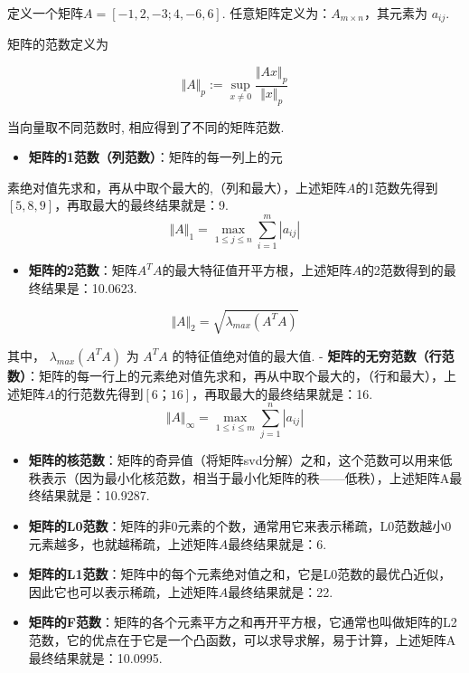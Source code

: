 定义一个矩阵\(A=[-1, 2, -3; 4, -6, 6]\).
任意矩阵定义为：\(A_{m\times n}\)，其元素为 \(a_{ij}\).

矩阵的范数定义为

\[
\Vert{A}\Vert_p :=\sup_{x\neq 0}\frac{\Vert{Ax}\Vert_p}{\Vert{x}\Vert_p}
\]

当向量取不同范数时, 相应得到了不同的矩阵范数.

\begin{itemize}
 
\item
  \textbf{矩阵的1范数（列范数）}：矩阵的每一列上的元
\end{itemize}

素绝对值先求和，再从中取个最大的,（列和最大），上述矩阵\(A\)的1范数先得到\([5,8,9]\)，再取最大的最终结果就是：9.
\[
\Vert A\Vert_1=\max_{1\le j\le n}\sum_{i=1}^m|{a_{ij}}|
\]

\begin{itemize}
 
\item
  \textbf{矩阵的2范数}：矩阵\(A^TA\)的最大特征值开平方根，上述矩阵\(A\)的2范数得到的最终结果是：10.0623.
\end{itemize}

\[
\Vert A\Vert_2=\sqrt{\lambda_{max}(A^T A)}
\]

其中， \(\lambda_{max}(A^T A)\) 为 \(A^T A​\) 的特征值绝对值的最大值. -
\textbf{矩阵的无穷范数（行范数）}：矩阵的每一行上的元素绝对值先求和，再从中取个最大的，（行和最大），上述矩阵\(A\)的行范数先得到\([6；16]\)，再取最大的最终结果就是：16.
\[
\Vert A\Vert_{\infty}=\max_{1\le i \le m}\sum_{j=1}^n |{a_{ij}}|
\]

\begin{itemize}
\item
  \textbf{矩阵的核范数}：矩阵的奇异值（将矩阵svd分解）之和，这个范数可以用来低秩表示（因为最小化核范数，相当于最小化矩阵的秩------低秩），上述矩阵A最终结果就是：10.9287.
\item
  \textbf{矩阵的L0范数}：矩阵的非0元素的个数，通常用它来表示稀疏，L0范数越小0元素越多，也就越稀疏，上述矩阵\(A\)最终结果就是：6.
\item
  \textbf{矩阵的L1范数}：矩阵中的每个元素绝对值之和，它是L0范数的最优凸近似，因此它也可以表示稀疏，上述矩阵\(A\)最终结果就是：22.\\
\item
  \textbf{矩阵的F范数}：矩阵的各个元素平方之和再开平方根，它通常也叫做矩阵的L2范数，它的优点在于它是一个凸函数，可以求导求解，易于计算，上述矩阵A最终结果就是：10.0995.
\end{itemize}

